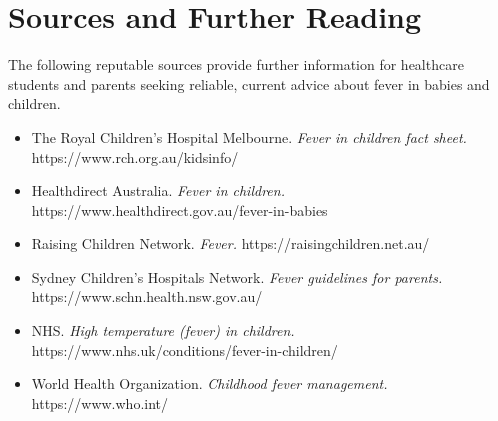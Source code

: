 \section*{Sources and Further Reading}
The following reputable sources provide further information for healthcare students and parents seeking reliable, current advice about fever in babies and children.
\begin{itemize}
    \item The Royal Children's Hospital Melbourne. \textit{Fever in children fact sheet.} https://www.rch.org.au/kidsinfo/
    \item Healthdirect Australia. \textit{Fever in children.} https://www.healthdirect.gov.au/fever-in-babies
    \item Raising Children Network. \textit{Fever.} https://raisingchildren.net.au/
    \item Sydney Children's Hospitals Network. \textit{Fever guidelines for parents.} https://www.schn.health.nsw.gov.au/
    \item NHS. \textit{High temperature (fever) in children.} https://www.nhs.uk/conditions/fever-in-children/
    \item World Health Organization. \textit{Childhood fever management.} https://www.who.int/
\end{itemize}
